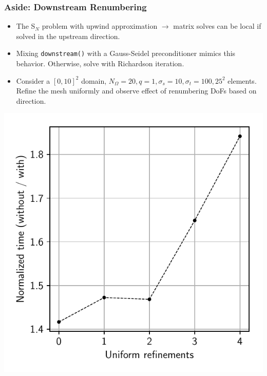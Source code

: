 \documentclass[xcolor={usenames,dvipsnames,svgnames,table}]{beamer}
\begin{document}
\begin{frame}\frametitle{Aside: Downstream Renumbering}
	\begin{minipage}{0.52\linewidth}
		\begin{itemize}
			\item The S$_N$ problem with upwind approximation $\rightarrow$ matrix solves can be local if solved in the upstream direction.
			\item Mixing \texttt{downstream()} with a Gauss-Seidel preconditioner mimics this behavior. Otherwise, solve with Richardson iteration.
			\item Consider a $[0,10]^2$ domain, $N_\Omega = 20, q = 1, \sigma_s = 10, \sigma_t = 100, 25^2$ elements. Refine the mesh uniformly and observe effect of renumbering DoFs based on direction.
		\end{itemize}
	\end{minipage}
	\hfill
	\begin{minipage}{0.45\linewidth}
		\includegraphics[width=\linewidth]{plots/renumbering}
	\end{minipage}
\end{frame}

\end{document}
